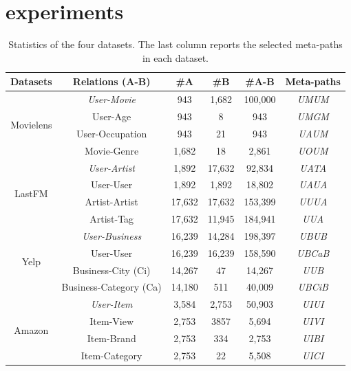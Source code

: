 \section{experiments}
\begin{table}[t]%
\centering
\scriptsize
\caption{\label{tab_Data} Statistics of the four datasets. %
The last column reports the selected meta-paths in each dataset. }
{
\begin{tabular}{c||c|c|c|c|c}
\hline
Datasets & {Relations (A-B)} & {\#A} & {\#B} & {\#A-B} & Meta-paths\\
\hline
\hline
\multirow{4}{*}{Movielens} & {\emph{User-Movie}} & {943} & {1,682} & {100,000}   & {\emph{UMUM}}\\
\cline{2-5}
\multirow{4}{*}{} &  {User-Age} & {943} & {8} & {943}    & {\emph{UMGM}}\\
\cline{2-5}
\multirow{4}{*}{} &{User-Occupation} & {943} & {21} & {943}  & {\emph{UAUM}}\\
\cline{2-5}
\multirow{4}{*}{} & {Movie-Genre} & {1,682} & {18} & {2,861}   & {\emph{UOUM}}\\
\hline
\hline
\multirow{4}{*}{LastFM} & {\emph{User-Artist}} & {1,892} & {17,632} & {92,834}  & {\emph{UATA}} \\
\cline{2-5}
\multirow{4}{*}{} & {User-User} & {1,892} & {1,892} & {18,802}   & {\emph{UAUA}}\\
\cline{2-5}
\multirow{4}{*}{} & {Artist-Artist} & {17,632} & {17,632} & {153,399}   & {\emph{UUUA}}\\
\cline{2-5}
\multirow{4}{*}{} & {Artist-Tag} & {17,632} & {11,945} & {184,941}   & {\emph{UUA}}\\
\hline
\hline
\multirow{4}{*}{Yelp} & {\emph{User-Business}} & {16,239} & {14,284} & {198,397}   & {\emph{UBUB}}\\
\cline{2-5}
\multirow{4}{*}{} & {User-User} & {16,239} & {16,239} & {158,590}  & {\emph{UBCaB}} \\
\cline{2-5}
\multirow{4}{*}{} & {Business-City (Ci)} & {14,267} & {47} & {14,267}  & {\emph{UUB}} \\
\cline{2-5}
\multirow{4}{*}{} & {Business-Category (Ca)} & {14,180} & {511} & {40,009}   & {\emph{UBCiB}}\\
\hline
\hline
\multirow{4}{*}{Amazon} & {\emph{User-Item}} & {3,584} & {2,753} & {50,903}   & {\emph{UIUI}}\\
\cline{2-5}
\multirow{4}{*}{} & {Item-View} & {2,753} & {3857} & {5,694}  & {\emph{UIVI}} \\
\cline{2-5}
\multirow{4}{*}{} & {Item-Brand} & {2,753} & {334} & {2,753}  & {\emph{UIBI}} \\
\cline{2-5}
\multirow{4}{*}{} & {Item-Category} & {2,753} & {22} & {5,508}   & {\emph{UICI}}\\
\hline
\end{tabular}}
\end{table}

